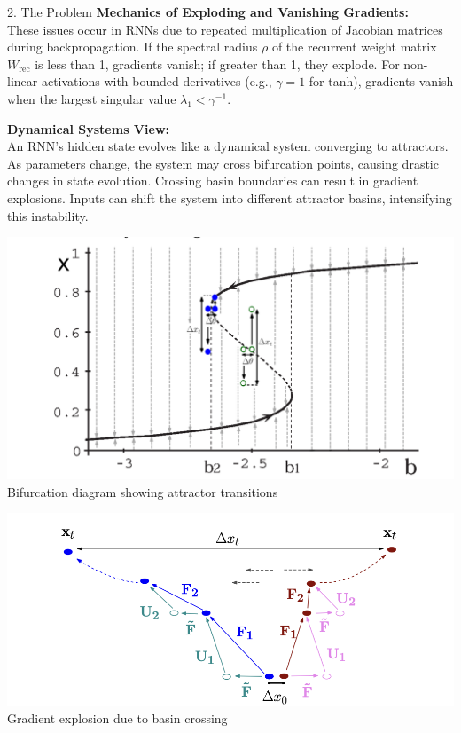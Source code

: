 \begin{frame}[t]
\begin{columns}[t,totalwidth=\textwidth]
\begin{column}{0.33\textwidth}
\begin{block}{2. The Problem}
    \textbf{Mechanics of Exploding and Vanishing Gradients:} \\
    These issues occur in RNNs due to repeated multiplication of Jacobian matrices during backpropagation. If the spectral radius $\rho$ of the recurrent weight matrix $W_{\text{rec}}$ is less than 1, gradients vanish; if greater than 1, they explode. For non-linear activations with bounded derivatives (e.g., $\gamma=1$ for tanh), gradients vanish when the largest singular value $\lambda_1 < \gamma^{-1}$.

    \vspace{0.5em}
    \textbf{Dynamical Systems View:} \\
    An RNN’s hidden state evolves like a dynamical system converging to attractors. As parameters change, the system may cross bifurcation points, causing drastic changes in state evolution. Crossing basin boundaries can result in gradient explosions. Inputs can shift the system into different attractor basins, intensifying this instability.

    \begin{center}
        \includegraphics[width=0.9\linewidth]{figures/bifurcation.png} \\
        \small Bifurcation diagram showing attractor transitions
    \end{center}
    
    \begin{center}
        \includegraphics[width=0.9\linewidth]{figures/function_and_input.png} \\
        \small Gradient explosion due to basin crossing
    \end{center}


\end{block}
\end{column}
\end{columns}
\end{frame}
